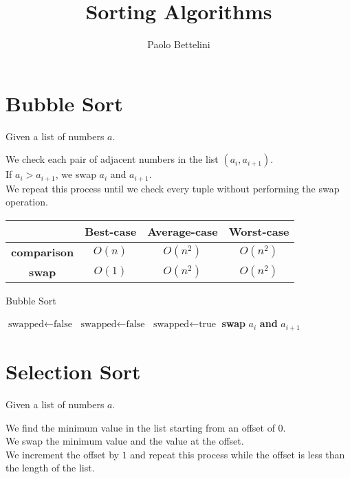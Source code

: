 \documentclass{article}
\title{Sorting Algorithms}
\author{Paolo Bettelini}
\date{}
\begin{document}
\maketitle
\tableofcontents
\pagebreak

\section{Bubble Sort}

Given a list of numbers \(a\).

We check each pair of adjacent numbers in the list \((a_i,a_{i+1})\).\\
If \(a_i>a_{i+1}\), we swap \(a_i\) and \(a_{i+1}\).\\
We repeat this process until we check every tuple without performing the swap operation.

\def\arraystretch{1.5}
\begin{center}
	\begin{tabular}{ |c|c|c|c| }
		\hline
		& \textbf{Best-case} & \textbf{Average-case} &\textbf{Worst-case} \\
		\hline
		\textbf{comparison} & \(O(n)\) & \(O(n^2)\) & \(O(n^2)\) \\ 
		\hline
		\textbf{swap} & \(O(1)\) & \(O(n^2)\) & \(O(n^2)\) \\ 
		\hline
	\end{tabular}
\end{center}

\begin{algorithm}
	\begin{algorithmic}
		\caption{Bubble Sort}
		\State \(\text{swapped}\gets\text{false}\)
		\Do{}
			\State \(\text{swapped}\gets\text{false}\)
					\State \(\text{swapped}\gets\text{true}\)
					\State \textbf{swap} \(a_i\) \textbf{and} \(a_{i+1}\)
				\EndIf
			\EndFor
	\end{algorithmic}
\end{algorithm}

\pagebreak

\section{Selection Sort}

Given a list of numbers \(a\).

We find the minimum value in the list starting from an offset of \(0\).\\
We swap the minimum value and the value at the offset.\\
We increment the offset by \(1\) and repeat this process while the offset is less than the length of the list.
\end{document}
